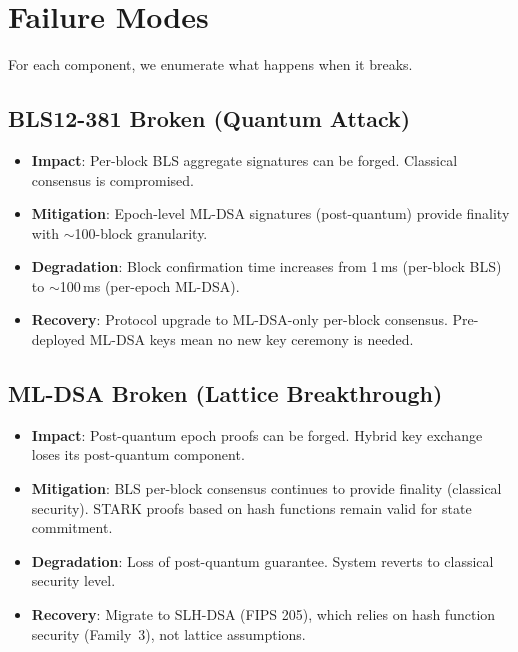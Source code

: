 \section{Failure Modes}

\label{sec:failure-modes}

For each component, we enumerate what happens when it breaks.

\subsection{BLS12-381 Broken (Quantum Attack)}

\begin{itemize}[leftmargin=2em]
  \item \textbf{Impact}: Per-block BLS aggregate signatures can be forged. Classical
        consensus is compromised.
  \item \textbf{Mitigation}: Epoch-level ML-DSA signatures (post-quantum) provide
        finality with $\sim$100-block granularity.
  \item \textbf{Degradation}: Block confirmation time increases from 1\,ms (per-block
        BLS) to $\sim$100\,ms (per-epoch ML-DSA).
  \item \textbf{Recovery}: Protocol upgrade to ML-DSA-only per-block consensus.
        Pre-deployed ML-DSA keys mean no new key ceremony is needed.
\end{itemize}

\subsection{ML-DSA Broken (Lattice Breakthrough)}

\begin{itemize}[leftmargin=2em]
  \item \textbf{Impact}: Post-quantum epoch proofs can be forged. Hybrid key exchange
        loses its post-quantum component.
  \item \textbf{Mitigation}: BLS per-block consensus continues to provide finality
        (classical security). STARK proofs based on hash functions remain valid for
        state commitment.
  \item \textbf{Degradation}: Loss of post-quantum guarantee. System reverts to
        classical security level.
  \item \textbf{Recovery}: Migrate to SLH-DSA (FIPS 205), which relies on hash
        function security (Family~3), not lattice assumptions.
\end{itemize}

